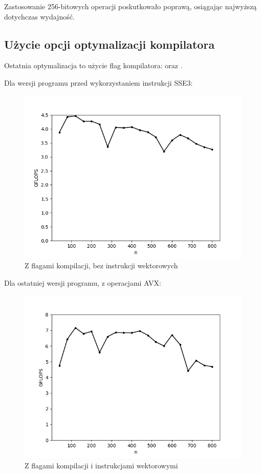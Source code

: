 \documentclass{article}
\begin{document}
Zastosowanie 256-bitowych operacji poskutkowało poprawą, osiągając najwyższą
dotychczas wydajność.

\subsection{Użycie opcji optymalizacji kompilatora}

Ostatnia optymalizacja to użycie flag kompilatora:  oraz .

Dla wersji programu przed wykorzystaniem instrukcji SSE3:

\begin{figure}[H]
    \centering
    \includegraphics[width=1.0\textwidth]{figures/fig5.png}
    \caption{Z flagami kompilacji, bez instrukcji wektorowych}
\end{figure}

Dla ostatniej wersji programu, z operacjami AVX:

\begin{figure}[H]
    \centering
    \includegraphics[width=1.0\textwidth]{figures/fig6.png}
    \caption{Z flagami kompilacji i instrukcjami wektorowymi}
\end{figure}
\end{document}
